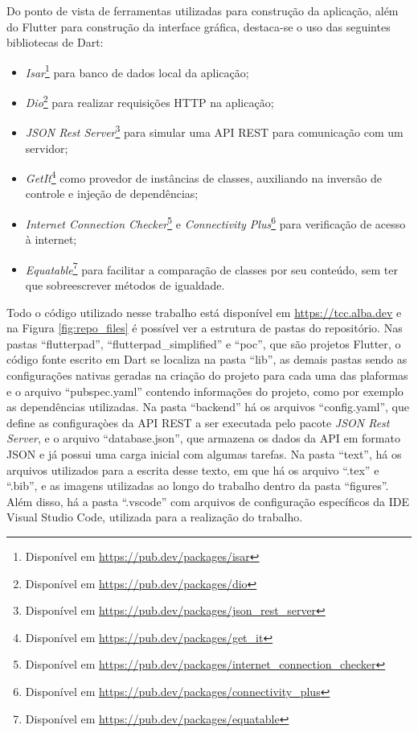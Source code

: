 \documentclass[12pt, %
openright, 
oneside, %
a4paper,    %
brazil]{facom-ufu-abntex2}
\begin{document}
Do ponto de vista de ferramentas utilizadas para construção da aplicação, além do Flutter para construção da interface gráfica, destaca-se o uso das seguintes bibliotecas de Dart:
\begin{itemize}
    \item \textit{Isar}\footnote{Disponível em \href{https://pub.dev/packages/isar}{https://pub.dev/packages/isar}} para banco de dados local da aplicação;
    \item \textit{Dio}\footnote{Disponível em \href{https://pub.dev/packages/dio}{https://pub.dev/packages/dio}} para realizar requisições HTTP na aplicação;
    \item \textit{JSON Rest Server}\footnote{Disponível em \href{https://pub.dev/packages/json_rest_server}{https://pub.dev/packages/json\_rest\_server}} para simular uma API REST para comunicação com um servidor;
    \item \textit{GetIt}\footnote{Disponível em \href{https://pub.dev/packages/get_it}{https://pub.dev/packages/get\_it}} como provedor de instâncias de classes, auxiliando na inversão de controle e injeção de dependências;
    \item \textit{Internet Connection Checker}\footnote{Disponível em \href{https://pub.dev/packages/internet_connection_checker}{https://pub.dev/packages/internet\_connection\_checker}} e \textit{Connectivity Plus}\footnote{Disponível em \href{https://pub.dev/packages/connectivity_plus}{https://pub.dev/packages/connectivity\_plus}} para verificação de acesso à internet;
    \item \textit{Equatable}\footnote{Disponível em \href{https://pub.dev/packages/equatable}{https://pub.dev/packages/equatable}} para facilitar a comparação de classes por seu conteúdo, sem ter que sobreescrever métodos de igualdade.
\end{itemize}

Todo o código utilizado nesse trabalho está disponível em \href{https://tcc.alba.dev}{https://tcc.alba.dev} e na Figura \ref{fig:repo_files} é possível ver a estrutura de pastas do repositório. Nas pastas ``flutterpad'', ``flutterpad\_simplified'' e ``poc'', que são projetos Flutter, o código fonte escrito em Dart se localiza na pasta ``lib'', as demais pastas sendo as configurações nativas geradas na criação do projeto para cada uma das plaformas e o arquivo ``pubspec.yaml'' contendo informações do projeto, como por exemplo as dependências utilizadas. Na pasta ``backend'' há os arquivos ``config.yaml'', que define as configuraçòes da API REST a ser executada pelo pacote \textit{JSON Rest Server}, e o arquivo ``database.json'', que armazena os dados da API em formato JSON e já possui uma carga inicial com algumas tarefas. Na pasta ``text'', há os arquivos utilizados para a escrita desse texto, em que há os arquivo ``.tex'' e ``.bib'', e as imagens utilizadas ao longo do trabalho dentro da pasta ``figures''. Além disso, há a pasta ``.vscode'' com arquivos de configuração específicos da IDE Visual Studio Code, utilizada para a realização do trabalho.
\end{document}
